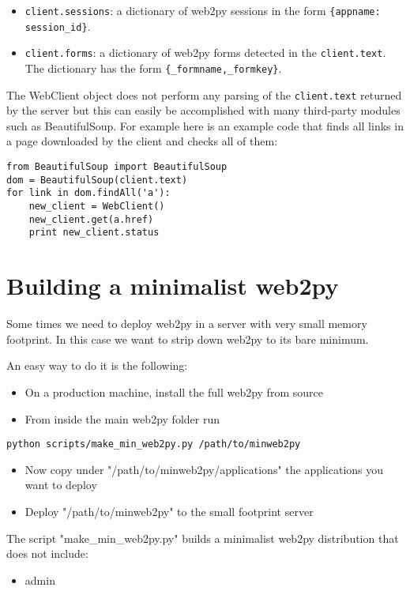\documentclass[justified,sixbynine,notoc]{tufte-book}
\def\ft{\small\tt}
\begin{document}
\begin{fullwidth}
\begin{itemize}
\item {\ft client.sessions}: a dictionary of web2py sessions in the form {\ft \{appname: session\_id\}}.

\item {\ft client.forms}: a dictionary of web2py forms detected in the {\ft client.text}. The dictionary has the form {\ft \{\_formname,\_formkey\}}.
\end{itemize}

The WebClient object does not perform any parsing of the {\ft client.text} returned by the server but this can easily be accomplished with many third-party modules such as BeautifulSoup. For example here is an example code that finds all links in a page downloaded by the client and checks all of them:

\begin{lstlisting}
from BeautifulSoup import BeautifulSoup
dom = BeautifulSoup(client.text)
for link in dom.findAll('a'):
    new_client = WebClient()
    new_client.get(a.href)
    print new_client.status
\end{lstlisting}

\goodbreak\section{Building a minimalist web2py}

Some times we need to deploy web2py in a server with very small memory footprint. In this case we want to strip down web2py to its bare minimum.

An easy way to do it is the following:
\begin{itemize}
\item On a production machine, install the full web2py from source

\item From inside the main web2py folder run
\end{itemize}
\begin{lstlisting}
python scripts/make_min_web2py.py /path/to/minweb2py
\end{lstlisting}
\begin{itemize}
\item Now copy under "/path/to/minweb2py/applications" the applications you want to deploy

\item Deploy "/path/to/minweb2py" to the small footprint server
\end{itemize}

The script "make\_min\_web2py.py" builds a minimalist web2py distribution that does not include:
\begin{itemize}
\item admin


\end{itemize}
\end{fullwidth}
\end{document}
